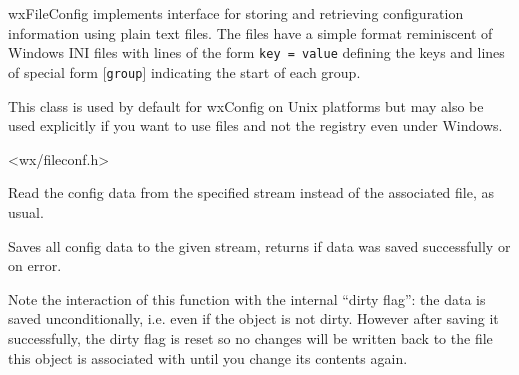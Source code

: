 
\section{}\label{wxfileconfig}

wxFileConfig implements  interface for
storing and retrieving configuration information using plain text files. The
files have a simple format reminiscent of Windows INI files with lines of the
form \texttt{key = value} defining the keys and lines of special form
\texttt{$[$group$]$} indicating the start of each group.

This class is used by default for wxConfig on Unix platforms but may also be
used explicitly if you want to use files and not the registry even under
Windows.




<wx/fileconf.h>





Read the config data from the specified stream instead of the associated file,
as usual.






Saves all config data to the given stream, returns \true if data was saved
successfully or \false on error.

Note the interaction of this function with the internal ``dirty flag'': the
data is saved unconditionally, i.e. even if the object is not dirty. However
after saving it successfully, the dirty flag is reset so no changes will be
written back to the file this object is associated with until you change its
contents again.

